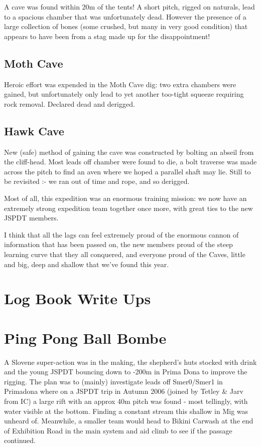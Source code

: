 A cave was found within 20m of the tents! A short pitch, rigged on
naturals, lead to a spacious chamber that was unfortunately dead.
However the presence of a large collection of bones (some crushed, but
many in very good condition) that appears to have been from a stag made
up for the disappointment!

\subsection{Moth Cave}\label{moth-cave}

Heroic effort was expended in the Moth Cave dig: two extra chambers were
gained, but unfortunately only lead to yet another too-tight squeeze
requiring rock removal. Declared dead and derigged.

\subsection{Hawk Cave}\label{hawk-cave}

New (safe) method of gaining the cave was constructed by bolting an
abseil from the cliff-head. Most leads off chamber were found to die, a
bolt traverse was made across the pitch to find an aven where we hoped a
parallel shaft may lie. Still to be revisited :- we ran out of time and
rope, and so derigged.

Most of all, this expedition was an enormous training mission: we now
have an extremely strong expedition team together once more, with great
ties to the new JSPDT members.

I think that all the lags can feel extremely proud of the enormous
cannon of information that has been passed on, the new members proud of
the steep learning curve that they all conquered, and everyone proud of
the Caves, little and big, deep and shallow that we've found this year.


\section{Log Book Write Ups}\label{log-book-write-ups}

\section{Ping Pong Ball Bombe}\label{ping-pong-ball-bombe}

A Slovene super-action was in the making, the shepherd's huts stocked
with drink and the young JSPDT bouncing down to -200m in Prima Dona to
improve the rigging. The plan was to (mainly) investigate leads off
Smer0/Smer1 in Primadona where on a JSPDT trip in Autumn 2006 (joined by
Tetley \& Jarv from IC) a large rift with an approx 40m pitch was found
- most tellingly, with water visible at the bottom. Finding a constant
stream this shallow in Mig was unheard of. Meanwhile, a smaller team
would head to Bikini Carwash at the end of Exhibition Road in the main
system and aid climb to see if the passage continued.

